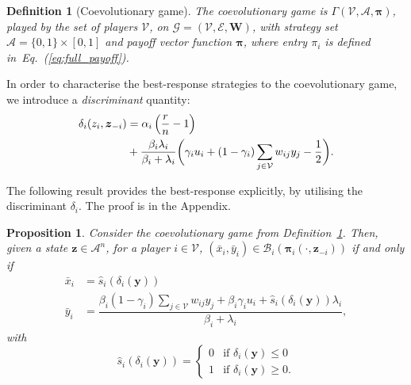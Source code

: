 \documentclass[letterpaper, 10 pt, conference]{ieeeconf}  %
\newcommand{\vect}[1]{\boldsymbol{#1}}
\newcommand{\mat}[1]{\boldsymbol{#1}}
\newtheorem{definition}{Definition}
\newtheorem{proposition}{Proposition}
\renewcommand{\eqref}[1]{Eq.~(\ref{#1})}  %
\begin{document}
\begin{definition}[Coevolutionary game] \label{d:coev_game}
    The coevolutionary game is $\Gamma(\mathcal{V}, \mathcal{A}, \boldsymbol{\pi})$, played by the set of players $\mathcal V$, on $\mathcal G = (\mathcal{V},\mathcal E, \mat W)$, with strategy set $\mathcal A = \{0,1\}\times[0,1]$ and payoff vector function $\vect{\pi}$, where entry $\pi_i$ is defined in~\eqref{eq:full_payoff}.
\end{definition}

In order to characterise the best-response strategies to the coevolutionary game, we introduce a \textit{discriminant} quantity:%
\begin{align}\label{eq:discriminant}
    \delta_i(z_i,\vect{z}_{-i}) &=  \alpha_i\left( \dfrac{r}{n}-1 \right) \\ \notag
    &+ \frac{\beta_i\lambda_i}{\beta_i+\lambda_i}\bigg(\gamma_iu_i+(1-\gamma_i)\sum_{j\in\mathcal{V}}w_{ij}y_j-\frac{1}{2}\bigg).
\end{align} 

The following result provides the best-response explicitly, by utilising the discriminant $\delta_i$. The proof is in the Appendix.
\begin{proposition}\label{prop:BR}
    Consider the coevolutionary game from Definition~\ref{d:coev_game}. Then,  %
    given a state $\vect z\in\mathcal A^n$, for a player $i\in\mathcal V$, $(\bar x_i,\bar y_i)\in \mathcal{B}_i(\vect \pi_i(\cdot,\boldsymbol{z}_{-i}))$ if and only if
    \begin{align}
        \bar{x}_i &= \hat s_i(\delta_i(\vect{y})) \label{eq:BR_action} \\
        \bar y_i &= \dfrac{\beta_i(1-\gamma_i)\sum_{j\in\mathcal{V}}w_{ij}y_j+\beta_i\gamma_iu_i+\hat s_i(\delta_i(\vect y))\lambda_i}{\beta_i+\lambda_i},\label{eq:BR_opinion}
    \end{align}
    with %
    \begin{equation}
        \hat s_i(\delta_i(\vect{y})) = \left\{\begin{array}{ll}0&\text{if }\delta_i(\vect{y})\leq 0\\
        1&\text{if }\delta_i(\vect{y})\geq0.\end{array}\right.
    \end{equation}    
\end{proposition}
\end{document}
